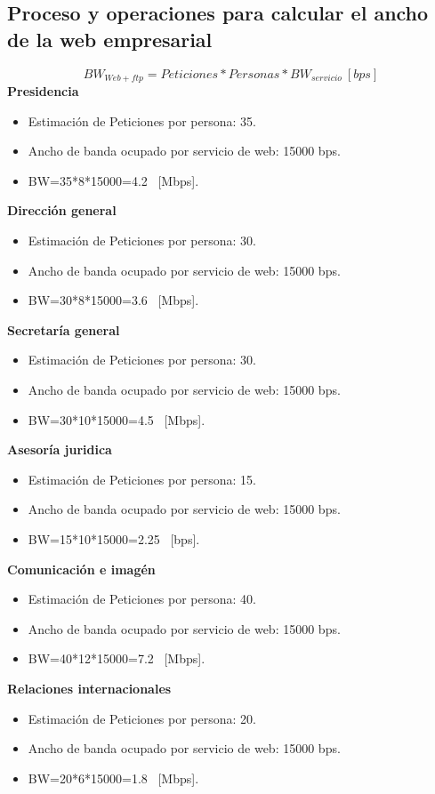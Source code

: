 \documentclass[12pt,letterpaper]{article}
\begin{document}
\subsection{Proceso y operaciones para calcular el ancho de la web empresarial}
\begin{equation}
    BW_{Web+ftp}=Peticiones*Personas*BW_{servicio} \ [bps]
\end{equation}
\textbf{Presidencia}
\begin{itemize}
    \item Estimación de Peticiones por persona: 35. 
    \item Ancho de banda ocupado por servicio de web: 15000 bps.
    \item BW=35*8*15000=4.2 \ [Mbps].
\end{itemize}
\textbf{Dirección general}
\begin{itemize}
    \item Estimación de Peticiones por persona: 30. 
    \item Ancho de banda ocupado por servicio de web: 15000 bps.
    \item BW=30*8*15000=3.6 \ [Mbps].
\end{itemize}
\textbf{Secretaría general}
\begin{itemize}
    \item Estimación de Peticiones por persona: 30. 
    \item Ancho de banda ocupado por servicio de web: 15000 bps.
    \item BW=30*10*15000=4.5 \ [Mbps].
\end{itemize}
\textbf{Asesoría juridica}
\begin{itemize}
    \item Estimación de Peticiones por persona: 15. 
    \item Ancho de banda ocupado por servicio de web: 15000 bps.
    \item BW=15*10*15000=2.25 \ [bps].
\end{itemize}
\textbf{Comunicación e imagén}
\begin{itemize}
    \item Estimación de Peticiones por persona: 40. 
    \item Ancho de banda ocupado por servicio de web: 15000 bps.
    \item BW=40*12*15000=7.2 \ [Mbps].
\end{itemize}
\textbf{Relaciones internacionales}
\begin{itemize}
    \item Estimación de Peticiones por persona: 20. 
    \item Ancho de banda ocupado por servicio de web: 15000 bps.
    \item BW=20*6*15000=1.8 \ [Mbps].
\end{itemize}
\end{document}
